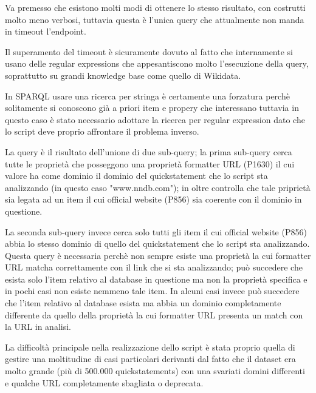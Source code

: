 Va premesso che esistono molti modi di ottenere lo stesso risultato, con costrutti molto meno verbosi, tuttavia questa è l'unica query che attualmente non manda in timeout l'endpoint.

Il superamento del timeout è sicuramente dovuto al fatto che internamente si usano delle regular expressions che appesantiscono molto l'esecuzione della query, soprattutto su 
grandi knowledge base come quello di Wikidata. 

In SPARQL usare una ricerca per stringa è certamente una forzatura perchè solitamente si conoscono già a priori item e propery che interessano tuttavia in questo caso è 
stato necessario adottare la ricerca per regular expression dato che lo script deve proprio affrontare il problema inverso.

La query è il risultato dell'unione di due sub-query; la prima sub-query cerca tutte le proprietà che posseggono una proprietà formatter URL (P1630) il cui valore ha come dominio il 
dominio del quickstatement che lo script sta analizzando (in questo caso "www.nndb.com"); in oltre controlla che tale priprietà sia legata ad un item il cui official website (P856) 
sia coerente con il dominio in questione. 

La seconda sub-query invece cerca solo tutti gli item il cui official website (P856) abbia lo stesso dominio di quello del quickstatement che lo script sta analizzando. 
Questa query è necessaria perchè non sempre esiste una proprietà la cui formatter URL matcha correttamente con il link che si sta analizzando; può succedere che esista solo l'item 
relativo al database in questione ma non la proprietà specifica e in pochi casi non esiste nemmeno tale item. In alcuni casi invece può succedere che l'item relativo al database 
esista ma abbia un dominio completamente differente da quello della proprietà la cui formatter URL presenta un match con la URL in analisi. 

La difficoltà principale nella realizzazione dello script è stata proprio quella di gestire una moltitudine di casi particolari derivanti dal fatto che il dataset era molto grande
(più di 500.000 quickstatements) con una svariati domini differenti e qualche URL completamente sbagliata o deprecata. 

